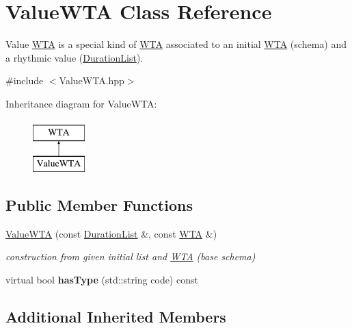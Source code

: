 \hypertarget{classValueWTA}{}\section{Value\+W\+TA Class Reference}
\label{classValueWTA}


Value \mbox{\hyperlink{classWTA}{W\+TA}} is a special kind of \mbox{\hyperlink{classWTA}{W\+TA}} associated to an initial \mbox{\hyperlink{classWTA}{W\+TA}} (schema) and a rhythmic value (\mbox{\hyperlink{classDurationList}{Duration\+List}}).  




{\ttfamily \#include $<$Value\+W\+T\+A.\+hpp$>$}

Inheritance diagram for Value\+W\+TA\+:\begin{figure}[H]
\begin{center}
\leavevmode
\includegraphics[height=2.000000cm]{classValueWTA}
\end{center}
\end{figure}
\subsection*{Public Member Functions}
\begin{DoxyCompactItemize}
\item 
\mbox{\hyperlink{group__schemata_gab35a1ee1d6e2b2b5d82b930b4d70340f}{Value\+W\+TA}} (const \mbox{\hyperlink{classDurationList}{Duration\+List}} \&, const \mbox{\hyperlink{classWTA}{W\+TA}} \&)
\begin{DoxyCompactList}\small\item\em construction from given initial list and \mbox{\hyperlink{classWTA}{W\+TA}} (base schema) \end{DoxyCompactList}\item 
\mbox{\label{classValueWTA_a4d5f75a4c4dd74e1b419786c30a3837a}} 
virtual bool {\bfseries has\+Type} (std\+::string code) const
\end{DoxyCompactItemize}
\subsection*{Additional Inherited Members}


